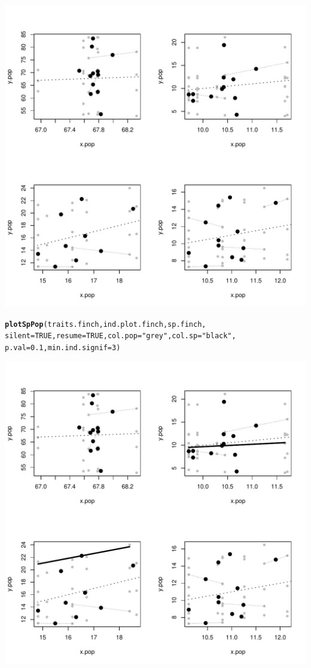 \documentclass[12pt]{article}\usepackage[]{graphicx}\usepackage[]{color}
\makeatletter
\def\maxwidth{ %
  \ifdim\Gin@nat@width>\linewidth
    \linewidth
  \else
    \Gin@nat@width
  \fi
}
\newcommand{\hlnum}[1]{\textcolor[rgb]{0.686,0.059,0.569}{#1}}%
\newcommand{\hlstr}[1]{\textcolor[rgb]{0.192,0.494,0.8}{#1}}%
\newcommand{\hlstd}[1]{\textcolor[rgb]{0.345,0.345,0.345}{#1}}%
\newcommand{\hlkwc}[1]{\textcolor[rgb]{0.333,0.667,0.333}{#1}}%
\newcommand{\hlkwd}[1]{\textcolor[rgb]{0.737,0.353,0.396}{\textbf{#1}}}%
\newenvironment{kframe}{%
 \def\at@end@of@kframe{}%
 \ifinner\ifhmode%
  \def\at@end@of@kframe{\end{minipage}}%
  \begin{minipage}{\columnwidth}%
 \fi\fi%
 \def\FrameCommand##1{\hskip\@totalleftmargin \hskip-\fboxsep
 \colorbox{shadecolor}{##1}\hskip-\fboxsep
     \hskip-\linewidth \hskip-\@totalleftmargin \hskip\columnwidth}%
 \MakeFramed {\advance\hsize-\width
   \@totalleftmargin\z@ \linewidth\hsize
   \@setminipage}}%
 {\par\unskip\endMakeFramed%
 \at@end@of@kframe}
\newenvironment{knitrout}{}{} %
\makeatother
\begin{document}
\begin{knitrout}
\includegraphics[width=\maxwidth]{figure/unnamed-chunk-272} 
\begin{kframe}\begin{alltt}
\hlkwd{plotSpPop}\hlstd{(traits.finch, ind.plot.finch, sp.finch,}
           \hlkwc{silent}\hlstd{=}\hlnum{TRUE}\hlstd{,} \hlkwc{resume}\hlstd{=}\hlnum{TRUE}\hlstd{,} \hlkwc{col.pop}\hlstd{=}\hlstr{"grey"}\hlstd{,} \hlkwc{col.sp}\hlstd{=}\hlstr{"black"}\hlstd{,}
           \hlkwc{p.val}\hlstd{=}\hlnum{0.1}\hlstd{,}  \hlkwc{min.ind.signif}\hlstd{=}\hlnum{3}\hlstd{)}
\end{alltt}
\end{kframe}
\includegraphics[width=\maxwidth]{figure/unnamed-chunk-273} 

\end{knitrout}
\end{document}
